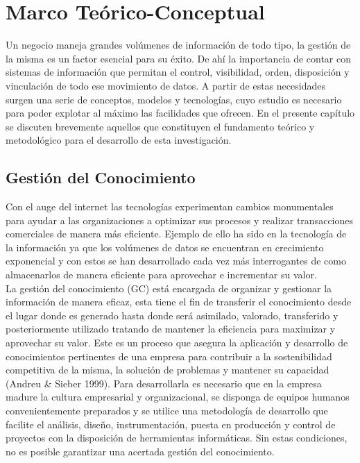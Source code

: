 \chapter{Marco Teórico-Conceptual}\label{chapter:state-of-the-art}
Un negocio maneja grandes volúmenes de información de todo tipo,  la gestión de la misma es un factor esencial para su éxito. De ahí la importancia de contar con sistemas de información que permitan el control, visibilidad, orden, disposición y vinculación de todo ese movimiento de datos. A partir de estas necesidades surgen una serie de conceptos, modelos y tecnologías, cuyo estudio es necesario para poder explotar al máximo las facilidades que ofrecen. En el presente capítulo se discuten brevemente aquellos que constituyen el fundamento teórico y metodológico para el desarrollo de esta investigación.

\section*{Gestión del Conocimiento}\label{gestion_conocimiento}
Con el auge del internet las tecnologías experimentan cambios monumentales para ayudar a las organizaciones a optimizar sus procesos y realizar transacciones  comerciales de manera más eficiente. Ejemplo de ello ha sido en la tecnología de la información ya que los volúmenes de datos se encuentran en crecimiento exponencial y con estos se han desarrollado cada vez más interrogantes de como almacenarlos de manera eficiente para aprovechar e incrementar su valor.\\

La gestión del conocimiento (GC) está encargada de organizar y gestionar la información de manera eficaz, esta tiene el fin de transferir el conocimiento desde el lugar donde es generado hasta donde será asimilado, valorado, transferido y posteriormente utilizado tratando de mantener la eficiencia para maximizar y aprovechar su valor. Este es un proceso que asegura la aplicación y desarrollo de conocimientos pertinentes de una empresa para contribuir a la sostenibilidad competitiva de la misma, la solución de problemas y mantener su capacidad (Andreu \& Sieber 1999). Para desarrollarla es necesario que en la empresa madure la cultura empresarial y organizacional, se disponga de equipos humanos convenientemente preparados y se utilice una metodología de desarrollo que facilite el análisis, diseño, instrumentación, puesta en producción y control de proyectos con la disposición de herramientas informáticas. Sin estas condiciones, no es posible garantizar una acertada gestión del conocimiento.\\

